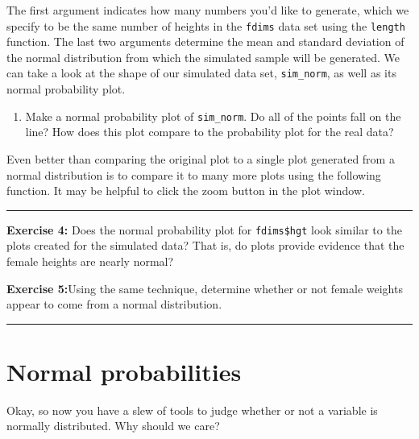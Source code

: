 \documentclass[]{book}
\newenvironment{Shaded}{\begin{snugshade}}{\end{snugshade}}
\newcommand{\KeywordTok}[1]{\textcolor[rgb]{0.13,0.29,0.53}{\textbf{#1}}}
\newcommand{\OperatorTok}[1]{\textcolor[rgb]{0.81,0.36,0.00}{\textbf{#1}}}
\newcommand{\NormalTok}[1]{#1}
\providecommand{\tightlist}{%
  \setlength{\itemsep}{0pt}\setlength{\parskip}{0pt}}
\theoremstyle{definition}
\theoremstyle{definition}
\theoremstyle{definition}
\theoremstyle{remark}
\begin{document}
The first argument indicates how many numbers you'd like to generate,
which we specify to be the same number of heights in the \texttt{fdims}
data set using the \texttt{length} function. The last two arguments
determine the mean and standard deviation of the normal distribution
from which the simulated sample will be generated. We can take a look at
the shape of our simulated data set, \texttt{sim\_norm}, as well as its
normal probability plot.

\begin{enumerate}
\def\labelenumi{\arabic{enumi}.}
\setcounter{enumi}{2}
\tightlist
\item
  Make a normal probability plot of \texttt{sim\_norm}. Do all of the
  points fall on the line? How does this plot compare to the probability
  plot for the real data?
\end{enumerate}

Even better than comparing the original plot to a single plot generated
from a normal distribution is to compare it to many more plots using the
following function. It may be helpful to click the zoom button in the
plot window.

\begin{Shaded}
\end{Shaded}

\begin{center}\rule{0.5\linewidth}{\linethickness}\end{center}

\textbf{Exercise 4:} Does the normal probability plot for
\texttt{fdims\$hgt} look similar to the plots created for the simulated
data? That is, do plots provide evidence that the female heights are
nearly normal?

\textbf{Exercise 5:}Using the same technique, determine whether or not
female weights appear to come from a normal distribution.

\begin{center}\rule{0.5\linewidth}{\linethickness}\end{center}

\section{Normal probabilities}\label{normal-probabilities}

Okay, so now you have a slew of tools to judge whether or not a variable
is normally distributed. Why should we care?
\end{document}
